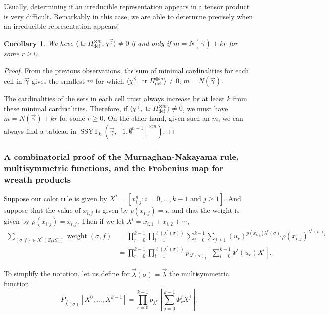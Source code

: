 \documentclass[a4paper,12pt]{amsart}
\theoremstyle{plain}
\newtheorem{corollary}[theorem]{Corollary}
\theoremstyle{definition}
\theoremstyle{remark}
\DeclareMathOperator{\defining}{def}
\DeclareMathOperator{\SSYT}{SSYT}
\DeclareMathOperator{\tr}{tr}
\DeclareMathOperator{\weight}{weight}
\begin{document}
Usually, determining if an irreducible representation appears in a tensor product is very difficult. Remarkably in this case, we are able to determine precisely when an irreducible representation appears!
\begin{corollary}
We have $\langle \tr \Pi_{\defining}^{\otimes m} , \chi^{\vec{\gamma}} \rangle \neq 0$
    if and only if $m = N(\vec{\gamma}) + kr$ for some $r\geq 0$.
\end{corollary}
\begin{proof}
    From the previous observations, the sum of minimal cardinalities for each cell in $\vec{\gamma}$ gives the smallest $m$ for which $\langle \chi^{\vec{\gamma}} , \tr \Pi_{\defining}^{\otimes m} \rangle \neq 0$:
$
m =N(\vec{\gamma}).
$

The cardinalities of the sets in each cell must always increase by at least $k$ from these minimal cardinalities. Therefore, if $\langle \chi^{\vec{\gamma}} , \tr \Pi_{\defining}^{\otimes m} \rangle \neq 0$, we must have $m = N(\vec{\gamma}) + kr$ for some $r\geq 0$. On the other hand, given such an $m$, we can always find a tableau in $\SSYT_k(\vec{\gamma},[1,\emptyset^{n-1}]^{\times m})$.
\end{proof}

\subsubsection[A combinatorial proof of the Murnaghan-Nakayama rule]{A combinatorial proof of the Murnaghan-Nakayama rule, multisymmetric functions, and the Frobenius map for wreath products}
\label{section:murnaghan-nakayama}
Suppose our color rule is given by $X^{\ast} = [x_{i,j}^n: i=0,\dots, k-1 \text{ and } j \geq 1]$. And suppose that the value of $x_{i,j}$ is given by $p(x_{i,j})  = i$, and that the weight is given by $\rho(x_{i,j} ) = x_{i,j}$. Then if we let $X^i = x_{i,1}+x_{i,2} + \cdots$,
\begin{align*}
\sum_{(\sigma,f) \in X^{\ast}(Z_k \wr S_n) } \weight(\sigma,f) & =   \prod_{r=0}^{k-1} 
\prod_{l=1}^{\ell(\lambda^r(\sigma))} \sum_{i=0}^{k-1} \sum_{j\geq 1} (u_r)^{p(x_{i,j})\lambda^r(\sigma)_l}  \rho(x_{i,j})^{\lambda^r(\sigma)_l} \\
& = 
\prod_{r=0}^{k-1} 
\prod_{l=1}^{\ell(\lambda^r(\sigma))} p_{\lambda^r(\sigma)_l} \left[ \sum_{i=0}^{k-1} { \Psi}^i(u_r) X^i \right].
\end{align*}

To simplify the notation, let us define for $\vec{\lambda}(\sigma) = \vec{\lambda}$ the multisymmetric function 
\[ P_{\vec{\lambda}(\sigma)}[X^0,\dots, X^{k-1}] = \prod_{r=0}^{k-1} p_{\lambda^r}\left[ \sum_{j=0}^{k-1} {\Psi}^j_r X^j \right]. \]
\end{document}
